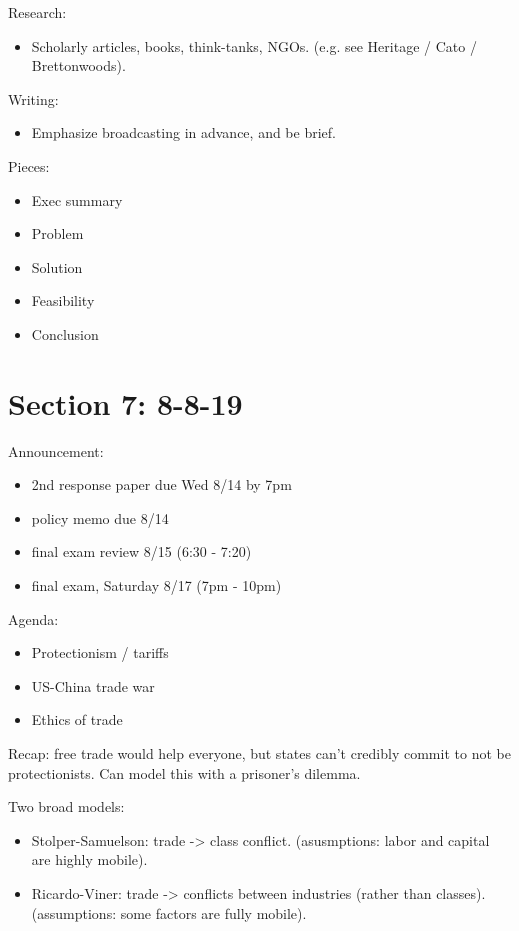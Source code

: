\documentclass{article}
\begin{document}
Research:

\begin{itemize}
  \item Scholarly articles, books, think-tanks, NGOs. (e.g. see Heritage / Cato / Brettonwoods).
\end{itemize}

Writing:
\begin{itemize}
  \item Emphasize broadcasting in advance, and be brief.
\end{itemize}

Pieces:
\begin{itemize}
  \item Exec summary
  \item Problem
  \item Solution
  \item Feasibility
  \item Conclusion
\end{itemize}

\section{Section 7: 8-8-19}

Announcement:
\begin{itemize}
  \item 2nd response paper due Wed 8/14 by 7pm
  \item policy memo due 8/14
  \item final exam review 8/15 (6:30 - 7:20)
  \item final exam, Saturday 8/17 (7pm - 10pm)
\end{itemize}

Agenda:
\begin{itemize}
  \item Protectionism / tariffs
  \item US-China trade war
  \item Ethics of trade
\end{itemize}

Recap: free trade would help everyone, but states can't credibly commit to not be protectionists.  Can model this with a prisoner's dilemma.

Two broad models:
\begin{itemize}
  \item Stolper-Samuelson: trade -> class conflict. (asusmptions: labor and capital are highly mobile).
  \item Ricardo-Viner: trade -> conflicts between industries (rather than classes). (assumptions: some factors are fully mobile).
\end{itemize}
\end{document}
